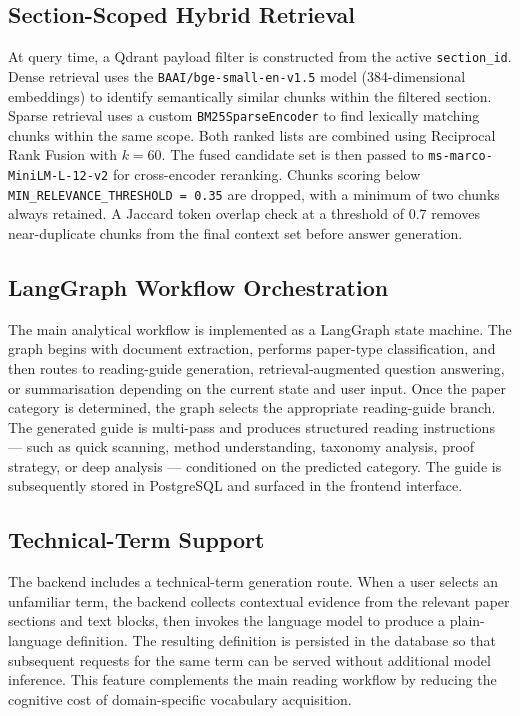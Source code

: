 \documentclass[12pt,a4paper]{report}
\begin{document}
\subsection{Section-Scoped Hybrid Retrieval}

At query time, a Qdrant payload filter is constructed from the active
\texttt{section\_id}. Dense retrieval uses the \texttt{BAAI/bge-small-en-v1.5}
model (384-dimensional embeddings) to identify semantically similar chunks
within the filtered section. Sparse retrieval uses a custom
\texttt{BM25SparseEncoder} to find lexically matching chunks within the same
scope. Both ranked lists are combined using Reciprocal Rank Fusion with
$k = 60$. The fused candidate set is then passed to
\texttt{ms-marco-MiniLM-L-12-v2} for cross-encoder reranking. Chunks scoring
below \texttt{MIN\_RELEVANCE\_THRESHOLD = 0.35} are dropped, with a minimum of
two chunks always retained. A Jaccard token overlap check at a threshold of
$0.7$ removes near-duplicate chunks from the final context set before answer
generation.

\subsection{LangGraph Workflow Orchestration}

The main analytical workflow is implemented as a LangGraph state machine. The
graph begins with document extraction, performs paper-type classification, and
then routes to reading-guide generation, retrieval-augmented question answering,
or summarisation depending on the current state and user input. Once the paper
category is determined, the graph selects the appropriate reading-guide branch.
The generated guide is multi-pass and produces structured reading instructions
— such as quick scanning, method understanding, taxonomy analysis, proof
strategy, or deep analysis — conditioned on the predicted category. The guide
is subsequently stored in PostgreSQL and surfaced in the frontend interface.

\subsection{Technical-Term Support}

The backend includes a technical-term generation route. When a user selects an
unfamiliar term, the backend collects contextual evidence from the relevant
paper sections and text blocks, then invokes the language model to produce a
plain-language definition. The resulting definition is persisted in the database
so that subsequent requests for the same term can be served without additional
model inference. This feature complements the main reading workflow by reducing
the cognitive cost of domain-specific vocabulary acquisition.
\end{document}
